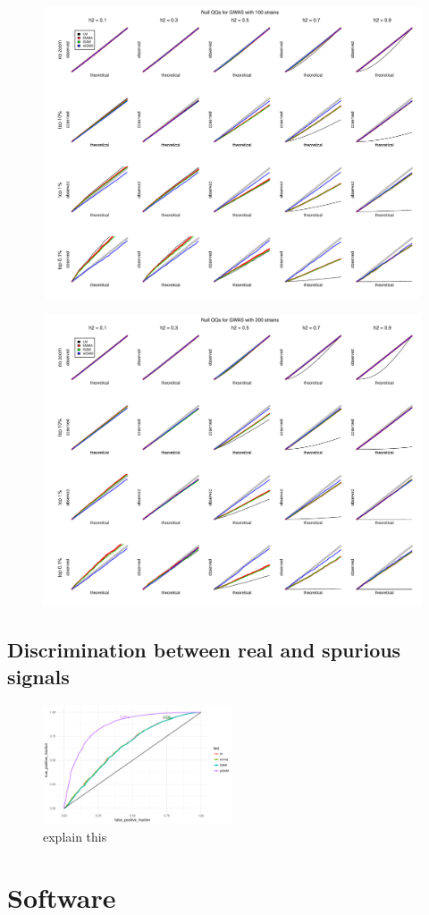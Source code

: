 \begin{figure}
  \includegraphics[width = \textwidth]{images/2018-05-19alt_heterosked_sims_nstrain=100_nsnps=100_nsims=10000.pdf}
\end{figure}

\begin{figure}
  \includegraphics[width = \textwidth]{images/2018-05-19alt_heterosked_sims_nstrain=200_nsnps=100_nsims=10000.pdf}
\end{figure}


\subsection{Discrimination between real and spurious signals}

\begin{figure}
  \centering
  \includegraphics[width = 0.5\textwidth]{images/roc_hetsked_100snps_1ksims_05h2_100strains.pdf}
  \caption{explain this}
  \label{fig:exampleROC}
\end{figure}


\section{Software}
